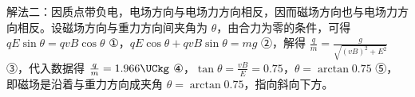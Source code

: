 \documentclass[\gkver]{gaokaozhenti}
\begin{document}
\begin{enumerate}
{解法二：因质点带负电，电场方向与电场力方向相反，因而磁场方向也与电场力方向相反。设磁场方向与重力方向间夹角为 $\theta$，由合力为零的条件，可得 $qE\sin\theta = qvB\cos\theta$ ①，$qE\cos\theta + qvB\sin\theta = mg$ ②，解得 $\frac{q}{m} = \frac{g}{\sqrt{(vB)^{2} + E^{2}}}$ ③，代入数据得 $\frac{q}{m} = 1.966\UCkg$ ④，$\tan\theta = \frac{vB}{E} = 0.75$，$\theta = \arctan 0.75$ ⑤，即磁场是沿着与重力方向成夹角 $\theta = \arctan 0.75$，指向斜向下方。

}

\end{enumerate}
\end{document}
